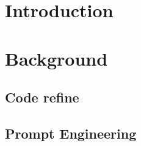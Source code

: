 \section{Introduction}









\section{Background}

\subsection{Code refine}


\subsection{Prompt Engineering}

